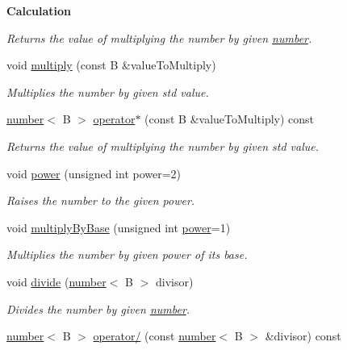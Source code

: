 \begin{Indent}{\bf Calculation}
\begin{DoxyCompactItemize}
\begin{DoxyCompactList}\small\item\em Returns the value of multiplying the number by given \hyperlink{classcjr_1_1number}{number}. \end{DoxyCompactList}\item 
void \hyperlink{classcjr_1_1number_aea945b8aecaad22c99b954bea3af1179}{multiply} (const B \&value\-To\-Multiply)
\begin{DoxyCompactList}\small\item\em Multiplies the number by given std value. \end{DoxyCompactList}\item 
\hypertarget{classcjr_1_1number_a91b1566c18c748235fd384ed7a45f404}{\hyperlink{classcjr_1_1number}{number}$<$ B $>$ \hyperlink{classcjr_1_1number_a91b1566c18c748235fd384ed7a45f404}{operator$\ast$} (const B \&value\-To\-Multiply) const }\label{classcjr_1_1number_a91b1566c18c748235fd384ed7a45f404}

\begin{DoxyCompactList}\small\item\em Returns the value of multiplying the number by given std value. \end{DoxyCompactList}\item 
void \hyperlink{classcjr_1_1number_ace65049054fa8b2a7498a3f2af7b7298}{power} (unsigned int power=2)
\begin{DoxyCompactList}\small\item\em Raises the number to the given power. \end{DoxyCompactList}\item 
void \hyperlink{classcjr_1_1number_a5854c154e869c908da1a978698704bf3}{multiply\-By\-Base} (unsigned int \hyperlink{classcjr_1_1number_ace65049054fa8b2a7498a3f2af7b7298}{power}=1)
\begin{DoxyCompactList}\small\item\em Multiplies the number by given power of its base. \end{DoxyCompactList}\item 
void \hyperlink{classcjr_1_1number_adbcfae18aafd8466f34599c85336b27b}{divide} (\hyperlink{classcjr_1_1number}{number}$<$ B $>$ divisor)
\begin{DoxyCompactList}\small\item\em Divides the number by given \hyperlink{classcjr_1_1number}{number}. \end{DoxyCompactList}\item 
\hypertarget{classcjr_1_1number_a20e0c77b3e6467be9d6dbea40e4bfd2f}{\hyperlink{classcjr_1_1number}{number}$<$ B $>$ \hyperlink{classcjr_1_1number_a20e0c77b3e6467be9d6dbea40e4bfd2f}{operator/} (const \hyperlink{classcjr_1_1number}{number}$<$ B $>$ \&divisor) const }\label{classcjr_1_1number_a20e0c77b3e6467be9d6dbea40e4bfd2f}


\end{DoxyCompactItemize}
\end{Indent}
